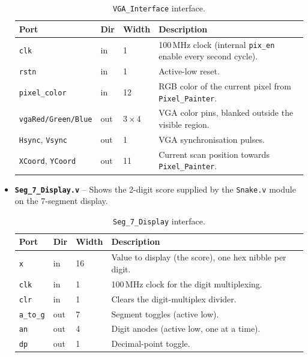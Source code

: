 \documentclass[11pt,a4paper]{article}
\begin{document}
\begin{itemize}
    \begin{table}[H]
      \centering\small
      \caption{\texttt{VGA\_Interface} interface.}
      \begin{tabular}{lllp{}}
        \toprule
        \textbf{Port} & \textbf{Dir} & \textbf{Width} & \textbf{Description} \\
        \midrule
        \texttt{clk} & in & 1 & 100\,MHz clock (internal \texttt{pix\_en}
          enable every second cycle). \\
        \texttt{rstn} & in & 1 & Active-low reset. \\
        \texttt{pixel\_color} & in & 12 & RGB color of the current pixel
          from \texttt{Pixel\_Painter}. \\
        \texttt{vgaRed/Green/Blue} & out & $3\times4$ & VGA color pins,
          blanked outside the visible region. \\
        \texttt{Hsync}, \texttt{Vsync} & out & 1 & VGA synchronisation pulses. \\
        \texttt{XCoord}, \texttt{YCoord} & out & 11 & Current scan position
          towards \texttt{Pixel\_Painter}. \\
        \bottomrule
      \end{tabular}
    \end{table}

  \item \textbf{\texttt{Seg\_7\_Display.v}} -- Shows the 2-digit score supplied by the \texttt{Snake.v} module on the 7-segment display.

    \begin{table}[H]
      \centering\small
      \caption{\texttt{Seg\_7\_Display} interface.}
      \begin{tabular}{lllp{}}
        \toprule
        \textbf{Port} & \textbf{Dir} & \textbf{Width} & \textbf{Description} \\
        \midrule
        \texttt{x} & in & 16 & Value to display (the score), one hex
          nibble per digit. \\
        \texttt{clk} & in & 1 & 100\,MHz clock for the digit multiplexing. \\
        \texttt{clr} & in & 1 & Clears the digit-multiplex divider. \\
        \texttt{a\_to\_g} & out & 7 & Segment toggles (active low). \\
        \texttt{an} & out & 4 & Digit anodes (active low, one at a time). \\
        \texttt{dp} & out & 1 & Decimal-point toggle. \\
        \bottomrule
      \end{tabular}
    \end{table}
\end{itemize}
\end{document}
